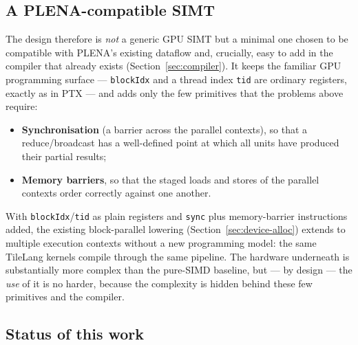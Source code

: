 \documentclass[11pt]{report}
\begin{document}
\subsection{A PLENA-compatible SIMT}

The design therefore is \emph{not} a generic GPU SIMT but a minimal one
chosen to be compatible with PLENA's existing dataflow and, crucially, easy
to add in the compiler that already exists (Section~\ref{sec:compiler}). It
keeps the familiar GPU programming surface --- \texttt{blockIdx} and a thread
index \texttt{tid} are ordinary registers, exactly as in PTX --- and adds
only the few primitives that the problems above require:

\begin{itemize}
\item \textbf{Synchronisation} (a barrier across the parallel contexts), so
that a reduce/broadcast has a well-defined point at which all units have
produced their partial results;
\item \textbf{Memory barriers}, so that the staged loads and stores of the
parallel contexts order correctly against one another.
\end{itemize}

With \texttt{blockIdx}/\texttt{tid} as plain registers and \texttt{sync} plus
memory-barrier instructions added, the existing block-parallel lowering
(Section~\ref{sec:device-alloc}) extends to multiple execution contexts
without a new programming model: the same TileLang kernels compile through the
same pipeline. The hardware underneath is substantially more complex than the
pure-SIMD baseline, but --- by design --- the \emph{use} of it is no harder,
because the complexity is hidden behind these few primitives and the compiler.

\subsection{Status of this work}
\label{sec:simt-status}
\end{document}
